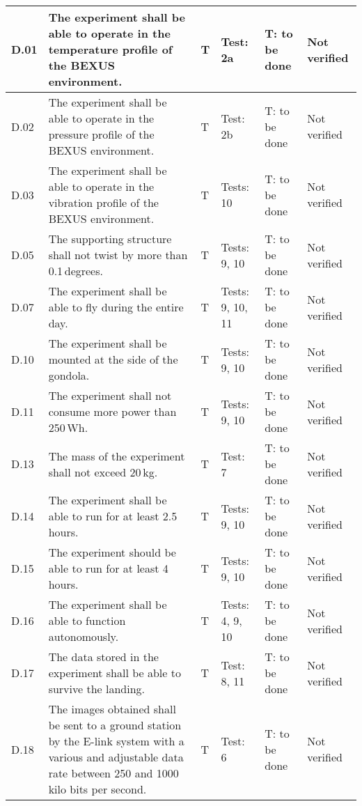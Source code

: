 \begin{longtable}[]{|m{}| m{}|m{}|m{}|m{}|m{}|}
D.01 & The experiment shall be able to operate in the temperature profile of the BEXUS environment.
& T & Test: 2a & T: to be done & Not verified \\\hline

D.02 & The experiment shall be able to operate in the pressure profile of the BEXUS environment.
& T & Test: 2b  & T: to be done & Not verified \\\hline

D.03 & The experiment shall be able to operate in the vibration profile of the BEXUS environment.
& T & Tests: 10 & T: to be done & Not verified \\\hline

D.05 & The supporting structure shall not twist by more than 0.1\,degrees.
& T & Tests: 9, 10 & T: to be done & Not verified \\\hline

D.07 & The experiment shall be able to fly during the entire day.
& T & Tests: 9, 10, 11 & T: to be done & Not verified \\\hline

D.10 & The experiment shall be mounted at the side of the gondola.
& T & Tests: 9, 10 & T: to be done & Not verified \\\hline

D.11 & The experiment shall not consume more power than 250\,Wh.
& T & Tests: 9, 10 & T: to be done & Not verified \\\hline

D.13 & The mass of the experiment shall not exceed 20\,kg.
& T & Test: 7 & T: to be done & Not verified \\\hline

D.14 & The experiment shall be able to run for at least 2.5\,hours.
& T & Tests: 9, 10 & T: to be done & Not verified \\\hline

D.15 & The experiment should be able to run for at least 4\,hours.
& T & Tests: 9, 10 & T: to be done & Not verified \\\hline

D.16 & The experiment shall be able to function autonomously.
& T & Tests: 4, 9, 10 & T: to be done & Not verified \\\hline

D.17 & The data stored in the experiment shall be able to survive the landing.
& T & Test: 8, 11 & T: to be done & Not verified \\\hline

  D.18 & The images obtained shall be sent to a ground station by the E-link system with a various and adjustable data rate between 250 and 1000 kilo bits per second.
& T & Test: 6 & T: to be done & Not verified \\\hline





\end{longtable}
